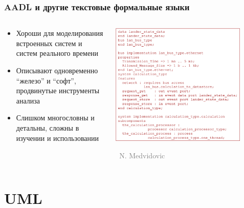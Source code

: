 \documentclass[xetex,mathserif,serif]{beamer}
\newcommand{\attribution}[1] {
	\vspace{-5mm}\begin{flushright}\begin{scriptsize}\textcolor{gray}{\textcopyright\, #1}\end{scriptsize}\end{flushright}
}
\begin{document}
	\begin{frame}
		\frametitle{AADL и другие текстовые формальные языки}
		\begin{columns}
			\begin{column}{0.4\textwidth}
				\begin{small}
					\begin{itemize}
						\item Хороши для моделирования встроенных систем и систем реального времени
						\item Описывают одновременно ``железо'' и ``софт'', продвинутые инструменты анализа
						\item Слишком многословны и детальны, сложны в изучении и использовании
					\end{itemize}
				\end{small}
			\end{column}
			\begin{column}{0.6\textwidth}
				\begin{center}
					\includegraphics[width=0.85\textwidth]{aadl.png}
					\attribution{N. Medvidovic}
				\end{center}
			\end{column}
		\end{columns}
	\end{frame}

	\section{UML}
\end{document}
